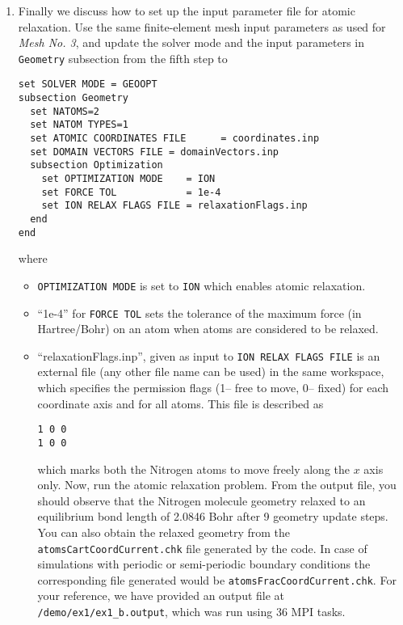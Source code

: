 \begin{enumerate}
\item Finally we discuss how to set up the input parameter file for atomic relaxation. Use the same finite-element mesh input parameters as used for \emph{Mesh No. 3}, and update the solver mode and the
input parameters in \verb|Geometry| subsection from the fifth step to
\begin{verbatim}
set SOLVER MODE = GEOOPT
subsection Geometry
  set NATOMS=2
  set NATOM TYPES=1
  set ATOMIC COORDINATES FILE      = coordinates.inp 
  set DOMAIN VECTORS FILE = domainVectors.inp
  subsection Optimization
    set OPTIMIZATION MODE    = ION
    set FORCE TOL            = 1e-4    
    set ION RELAX FLAGS FILE = relaxationFlags.inp
  end
end
\end{verbatim}
where
\begin{itemize}
\item \verb|OPTIMIZATION MODE| is set to \verb|ION| which enables atomic relaxation.  		
\item ``1e-4'' for \verb|FORCE TOL| sets the tolerance of the maximum force (in Hartree/Bohr) on an atom when atoms are
considered to be relaxed.
\item ``relaxationFlags.inp'', given as input to \verb|ION RELAX FLAGS FILE| is an external file (any other file name can be used) in the same workspace, which specifies the permission flags (1-- free to move, 0-- fixed) for each coordinate axis and for all atoms. This file is described as 
\begin{verbatim}
1 0 0
1 0 0
\end{verbatim}
which marks both the Nitrogen atoms to move freely along the $x$ axis only.
Now, run the atomic relaxation problem. From the output file, you should observe that the Nitrogen molecule geometry relaxed to
an equilibrium bond length of 2.0846 Bohr after 9 geometry update steps. You can also obtain the relaxed geometry from the \verb|atomsCartCoordCurrent.chk| file generated by the code. In case of simulations with periodic or semi-periodic boundary conditions the corresponding file generated would be \verb|atomsFracCoordCurrent.chk|. For your reference, we have provided an output file at \verb|/demo/ex1/ex1_b.output|, which was run using 36 MPI tasks.
\end{itemize}
\end{enumerate}


